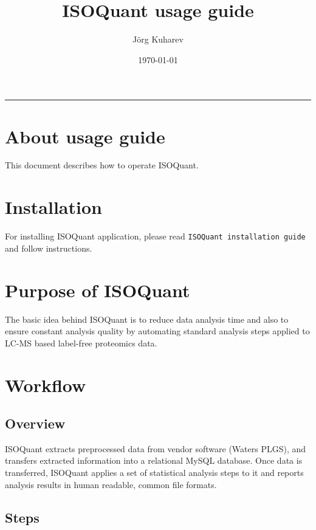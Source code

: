 \documentclass[]{article}
\title{ISOQuant usage guide}
\author{Jörg Kuharev}
\date{\today}
\begin{document}
\maketitle

{
\hypersetup{linkcolor=black}
\tableofcontents
}
\begin{center}\rule{3in}{0.4pt}\end{center}

\clearpage

\section{About usage guide}

This document describes how to operate ISOQuant.

\section{Installation}

For installing ISOQuant application, please read
\lstinline!ISOQuant installation guide! and follow instructions.

\section{Purpose of ISOQuant}

The basic idea behind ISOQuant is to reduce data analysis time and also
to ensure constant analysis quality by automating standard analysis
steps applied to LC-MS based label-free proteomics data.

\section{Workflow}

\subsection{Overview}

ISOQuant extracts preprocessed data from vendor software (Waters PLGS),
and transfers extracted information into a relational MySQL database.
Once data is transferred, ISOQuant applies a set of statistical analysis
steps to it and reports analysis results in human readable, common file
formats.

\subsection{Steps}
\end{document}

